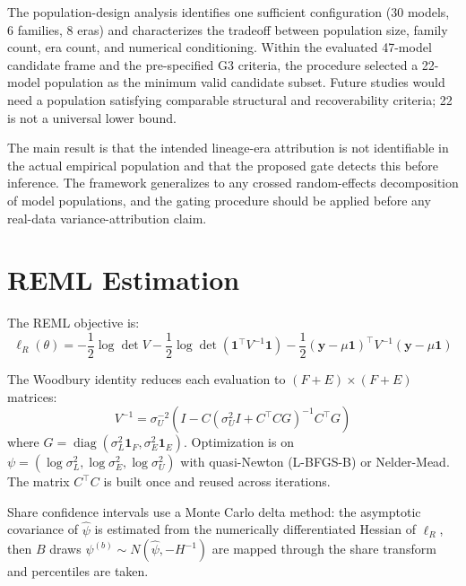 \documentclass[journal]{IEEEtran}
\begin{document}
The population-design analysis identifies one sufficient configuration (30 models, 6 families, 8 eras) and characterizes the tradeoff between population size, family count, era count, and numerical conditioning. Within the evaluated 47-model candidate frame and the pre-specified G3 criteria, the procedure selected a 22-model population as the minimum valid candidate subset. Future studies would need a population satisfying comparable structural and recoverability criteria; 22 is not a universal lower bound.

The main result is that the intended lineage-era attribution is not identifiable in the actual empirical population and that the proposed gate detects this before inference. The framework generalizes to any crossed random-effects decomposition of model populations, and the gating procedure should be applied before any real-data variance-attribution claim.

\appendices

\section{REML Estimation}
\label{app:reml}

The REML objective is:
\begin{equation}
\ell_R(\theta) = -\frac{1}{2} \log \det V - \frac{1}{2} \log \det(\mathbf{1}^\top V^{-1} \mathbf{1}) - \frac{1}{2}(\mathbf{y} - \mu \mathbf{1})^\top V^{-1}(\mathbf{y} - \mu \mathbf{1})
\label{eq:reml}
\end{equation}

The Woodbury identity reduces each evaluation to $(F + E) \times (F + E)$ matrices:
\begin{equation}
V^{-1} = \sigma^{-2}_U\left(I - C(\sigma^2_U I + C^\top C G)^{-1} C^\top G\right)
\label{eq:woodbury}
\end{equation}
where $G = \operatorname{diag}(\sigma^2_L \mathbf{1}_F, \sigma^2_E \mathbf{1}_E)$. Optimization is on $\psi = (\log \sigma^2_L, \log \sigma^2_E, \log \sigma^2_U)$ with quasi-Newton (L-BFGS-B) or Nelder-Mead. The matrix $C^\top C$ is built once and reused across iterations.

Share confidence intervals use a Monte Carlo delta method: the asymptotic covariance of $\hat{\psi}$ is estimated from the numerically differentiated Hessian of $\ell_R$, then $B$ draws $\psi^{(b)} \sim N(\hat{\psi}, -H^{-1})$ are mapped through the share transform and percentiles are taken.
\end{document}
